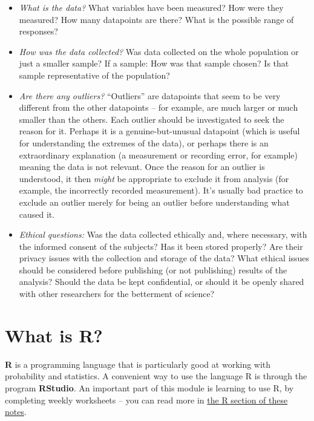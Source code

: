 \documentclass[
  letterpaper,
]{report}
\providecommand{\tightlist}{%
  \setlength{\itemsep}{0pt}\setlength{\parskip}{0pt}}\usepackage{longtable,booktabs,array}
\theoremstyle{definition}
\theoremstyle{definition}
\theoremstyle{remark}
\begin{document}
\begin{itemize}
\tightlist
\item
  \emph{What is the data?} What variables have been measured? How were
  they measured? How many datapoints are there? What is the possible
  range of responses?
\item
  \emph{How was the data collected?} Was data collected on the whole
  population or just a smaller sample? If a sample: How was that sample
  chosen? Is that sample representative of the population?
\item
  \emph{Are there any outliers?} ``Outliers'' are datapoints that seem
  to be very different from the other datapoints -- for example, are
  much larger or much smaller than the others. Each outlier should be
  investigated to seek the reason for it. Perhaps it is a
  genuine-but-unusual datapoint (which is useful for understanding the
  extremes of the data), or perhaps there is an extraordinary
  explanation (a measurement or recording error, for example) meaning
  the data is not relevant. Once the reason for an outlier is
  understood, it then \emph{might} be appropriate to exclude it from
  analysis (for example, the incorrectly recorded measurement). It's
  usually bad practice to exclude an outlier merely for being an outlier
  before understanding what caused it.
\item
  \emph{Ethical questions:} Was the data collected ethically and, where
  necessary, with the informed consent of the subjects? Has it been
  stored properly? Are their privacy issues with the collection and
  storage of the data? What ethical issues should be considered before
  publishing (or not publishing) results of the analysis? Should the
  data be kept confidential, or should it be openly shared with other
  researchers for the betterment of science?
\end{itemize}

\hypertarget{what-is-R}{%
\section{What is R?}\label{what-is-R}}

\textbf{R} is a programming language that is particularly good at
working with probability and statistics. A convenient way to use the
language R is through the program \textbf{RStudio}. An important part of
this module is learning to use R, by completing weekly worksheets -- you
can read more in \protect\hyperlink{R}{the R section of these notes}.
\end{document}
